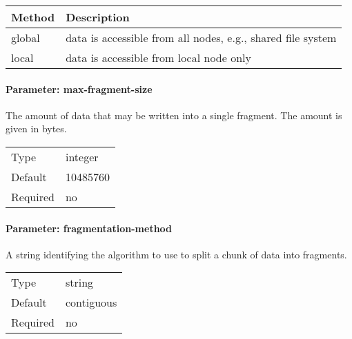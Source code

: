 \begin{preserve}
  \begin{center}
    \begin{tabularx}{\textwidth}{lX}
      Method & Description                                                 \\ 
      \hline
      global & data is accessible from all nodes, e.g., shared file system \\ 
      local  & data is accessible from local node only                     \\ 
    \end{tabularx}
  \end{center}
\end{preserve}
\FloatBarrier
\vspace{\gapsize}

\paragraph{Parameter: max-fragment-size}
The amount of data that may be written into a single fragment. 
The amount is given in bytes.

\begin{preserve}
  \noindent
  \begin{tabular}{ll}
    Type     & integer  \\ 
    Default  & 10485760 \\ 
    Required & no       \\ 
  \end{tabular}
\end{preserve}
\FloatBarrier
\vspace{\gapsize}


\paragraph{Parameter: fragmentation-method}
A string identifying the algorithm to use to split a chunk of data into fragments. 

\begin{preserve}
  \noindent
  \begin{tabular}{ll}
    Type     & string     \\ 
    Default  & contiguous \\ 
    Required & no         \\ 
  \end{tabular}
\end{preserve}

